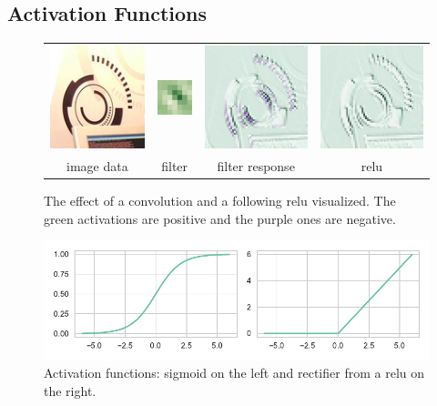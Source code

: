 \subsection{Activation Functions} %
\label{sub:conepts:nn:activations}
\begin{figure}
    \centering
    \begin{tabulary}{\linewidth}{CCCC}
        \includegraphics[height=3cm]{figures/activation_data} &
        \vspace{-1.8cm}\includegraphics[height=1cm]{figures/activation_filter} &
        \includegraphics[height=3cm]{figures/activation_response} &
        \includegraphics[height=3cm]{figures/activation_relu} \\
        image data & filter & filter response & \gls{relu} \\
    \end{tabulary}
    \caption{The effect of a convolution and a following \gls{relu} visualized. The green activations are positive and the purple ones are negative.}
\end{figure}
\begin{figure}
    \includegraphics{figures/sigmoid_relu}
    \caption{Activation functions: sigmoid on the left and rectifier from a \gls{relu} on the right.}
    \label{fig:sigmoid_relu}
\end{figure}
